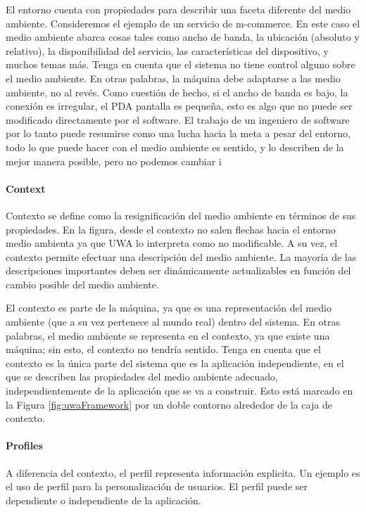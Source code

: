El entorno cuenta con propiedades para describir una
faceta diferente del medio ambiente. Consideremos el ejemplo de un
servicio de m-commerce. En este caso el medio ambiente abarca cosas tales como
ancho de banda, la ubicación (absoluto y relativo), la disponibilidad del
servicio, las características del dispositivo, y muchos temas más.
Tenga en cuenta que el sistema no tiene control alguno sobre el medio ambiente.
En otras palabras, la máquina debe adaptarse a las
medio ambiente, no al revés. Como cuestión de hecho, si el ancho de banda es
bajo, la conexión es irregular, el
PDA pantalla es pequeña, esto es algo que no puede ser modificado directamente
por el software. El trabajo de un ingeniero de software
por lo tanto puede resumirse como una lucha hacia la meta a pesar del entorno,
todo lo que puede hacer con el
medio ambiente es sentido, y lo describen de la mejor manera posible, pero no
podemos cambiar i


\paragraph{Context}

Contexto se define como la resignificación del medio ambiente en términos de
sus propiedades. En la figura, desde el contexto no salen flechas hacia el
entorno medio ambienta ya que UWA lo interpreta como no modificable. A su vez,
el contexto permite efectuar una descripción del medio ambiente. La mayoría de
las descripciones importantes deben ser dinámicamente actualizables en función 
del cambio posible del medio ambiente. 

El contexto es parte de la máquina, ya que es una representación del medio
ambiente (que a su vez pertenece al mundo real)
dentro del sistema. En otras palabras, el medio ambiente se representa en el
contexto, ya que existe una máquina;
sin esto, el contexto no tendría sentido. Tenga en cuenta que el contexto es la
única parte del sistema que es la aplicación
independiente, en el que se describen las propiedades del medio ambiente
adecuado, independientemente de la aplicación que se va a construir.
Esto está marcado en la Figura \ref{fig:uwaFramework}  por un doble contorno
alrededor de la caja de
contexto. 


\paragraph{Profiles}


A diferencia del contexto, el perfil representa información explicita. Un
ejemplo es el uso de perfil para la personalización de usuarios. El perfil
puede ser dependiente o independiente de la aplicación.


